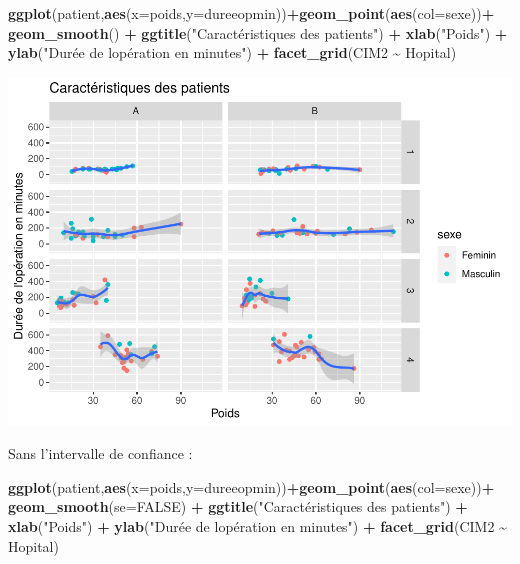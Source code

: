 \documentclass[
]{book}
\newenvironment{Shaded}{\begin{snugshade}}{\end{snugshade}}
\newcommand{\AttributeTok}[1]{\textcolor[rgb]{0.13,0.29,0.53}{#1}}
\newcommand{\ConstantTok}[1]{\textcolor[rgb]{0.56,0.35,0.01}{#1}}
\newcommand{\FunctionTok}[1]{\textcolor[rgb]{0.13,0.29,0.53}{\textbf{#1}}}
\newcommand{\NormalTok}[1]{#1}
\newcommand{\SpecialCharTok}[1]{\textcolor[rgb]{0.81,0.36,0.00}{\textbf{#1}}}
\newcommand{\StringTok}[1]{\textcolor[rgb]{0.31,0.60,0.02}{#1}}
\begin{document}
\begin{Shaded}
\begin{Highlighting}[]
\FunctionTok{ggplot}\NormalTok{(patient,}\FunctionTok{aes}\NormalTok{(}\AttributeTok{x=}\NormalTok{poids,}\AttributeTok{y=}\NormalTok{dureeopmin))}\SpecialCharTok{+}\FunctionTok{geom\_point}\NormalTok{(}\FunctionTok{aes}\NormalTok{(}\AttributeTok{col=}\NormalTok{sexe))}\SpecialCharTok{+}
  \FunctionTok{geom\_smooth}\NormalTok{() }\SpecialCharTok{+}
  \FunctionTok{ggtitle}\NormalTok{(}\StringTok{"Caractéristiques des patients"}\NormalTok{) }\SpecialCharTok{+} 
  \FunctionTok{xlab}\NormalTok{(}\StringTok{"Poids"}\NormalTok{) }\SpecialCharTok{+} 
  \FunctionTok{ylab}\NormalTok{(}\StringTok{"Durée de l\textquotesingle{}opération en minutes"}\NormalTok{) }\SpecialCharTok{+}
  \FunctionTok{facet\_grid}\NormalTok{(CIM2 }\SpecialCharTok{\textasciitilde{}}\NormalTok{ Hopital)}
\end{Highlighting}
\end{Shaded}

\includegraphics{_main_files/figure-latex/ggplot18-1.pdf}

Sans l'intervalle de confiance :

\begin{Shaded}
\begin{Highlighting}[]
\FunctionTok{ggplot}\NormalTok{(patient,}\FunctionTok{aes}\NormalTok{(}\AttributeTok{x=}\NormalTok{poids,}\AttributeTok{y=}\NormalTok{dureeopmin))}\SpecialCharTok{+}\FunctionTok{geom\_point}\NormalTok{(}\FunctionTok{aes}\NormalTok{(}\AttributeTok{col=}\NormalTok{sexe))}\SpecialCharTok{+}
  \FunctionTok{geom\_smooth}\NormalTok{(}\AttributeTok{se=}\ConstantTok{FALSE}\NormalTok{) }\SpecialCharTok{+}
  \FunctionTok{ggtitle}\NormalTok{(}\StringTok{"Caractéristiques des patients"}\NormalTok{) }\SpecialCharTok{+} 
  \FunctionTok{xlab}\NormalTok{(}\StringTok{"Poids"}\NormalTok{) }\SpecialCharTok{+} 
  \FunctionTok{ylab}\NormalTok{(}\StringTok{"Durée de l\textquotesingle{}opération en minutes"}\NormalTok{) }\SpecialCharTok{+}
  \FunctionTok{facet\_grid}\NormalTok{(CIM2 }\SpecialCharTok{\textasciitilde{}}\NormalTok{ Hopital)}
\end{Highlighting}
\end{Shaded}
\end{document}
